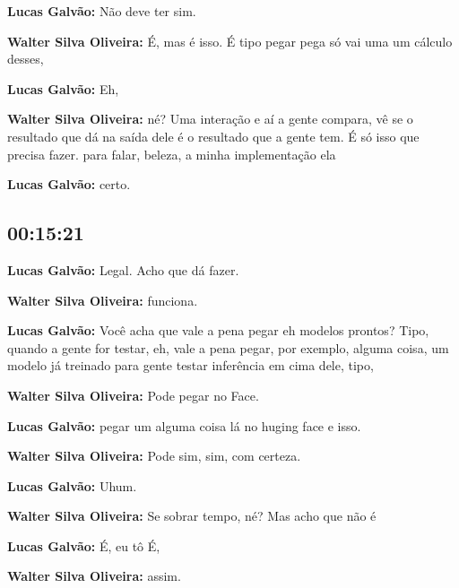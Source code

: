 \textbf{Lucas Galvão:} Não deve ter sim.



\textbf{Walter Silva Oliveira:} É, mas é isso. É tipo pegar pega só vai uma um cálculo desses,



\textbf{Lucas Galvão:} Eh,



\textbf{Walter Silva Oliveira:} né? Uma interação e aí a gente compara, vê se o resultado que dá na saída dele é o resultado que a gente tem. É só isso que precisa fazer. para falar, beleza, a minha implementação ela



\textbf{Lucas Galvão:} certo.



\subsection{\textbf{00:15:21}}



\textbf{Lucas Galvão:} Legal. Acho que dá fazer.



\textbf{Walter Silva Oliveira:} funciona.



\textbf{Lucas Galvão:} Você acha que vale a pena pegar eh modelos prontos? Tipo, quando a gente for testar, eh, vale a pena pegar, por exemplo, alguma coisa, um modelo já treinado para gente testar inferência em cima dele, tipo,



\textbf{Walter Silva Oliveira:} Pode pegar no Face.



\textbf{Lucas Galvão:} pegar um alguma coisa lá no huging face e isso.



\textbf{Walter Silva Oliveira:} Pode sim, sim, com certeza.



\textbf{Lucas Galvão:} Uhum.



\textbf{Walter Silva Oliveira:} Se sobrar tempo, né? Mas acho que não é



\textbf{Lucas Galvão:} É, eu tô É,



\textbf{Walter Silva Oliveira:} assim.



